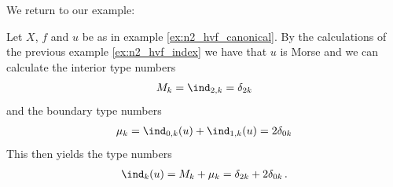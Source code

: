 



We return to our example:
\begin{example}
  Let $X$, $f$ and $u$ be as in example \ref{ex:n2_hvf_canonical}. By the calculations of the previous example
  \ref{ex:n2_hvf_index} we have that $u$ is Morse and we can calculate the interior type numbers
  \begin{align*}
    M_k=\ind_{2,k}=\delta_{2k}
  \end{align*}
  and the boundary type numbers
  \begin{align*}
    \mu_k=\ind_{0,k}(u)+\ind_{1,k}(u)=2\delta_{0k}\\
  \end{align*}
  This then yields the type numbers
  \begin{align*}
    \ind_k(u)=M_k+\mu_k=\delta_{2k}+2\delta_{0k}\,.
  \end{align*}
\end{example}

